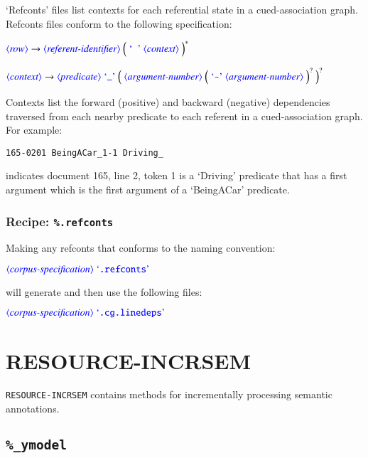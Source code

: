 \documentclass[12pt]{report}
\def\blue{\color{blue}}
\def\magenta{\color{magenta}}
\begin{document}
`Refconts' files list contexts for each referential state in a cued-association graph.
%
Refconts files conform to the following specification:

$\dtype{row} \rightarrow \dtype{referent-identifier} \ \Big( \ \dcode{\ } \ \dtype{context} \ \Big)^*$

$\dtype{context} \rightarrow \dtype{predicate} \ \dcode{\_} \ \Big( \ \dtype{argument-number} \ \Big( \ \dcode{-} \ \dtype{argument-number} \ \Big)^? \ \Big)^?$

Contexts list the forward (positive) and backward (negative) dependencies traversed from each nearby predicate to each referent in a cued-association graph.
%
For example:
%
{\magenta\begin{verbatim}
165-0201 BeingACar_1-1 Driving_
\end{verbatim}
}
%
indicates document 165, line 2, token 1 is a `Driving' predicate that has a first argument which is the first argument of a `BeingACar' predicate.

\subsection{Recipe: {\blue\tt \%.refconts}}

Making any refconts that conforms to the naming convention:

$\dtype{corpus-specification} \ \dcode{.refconts}$

will generate and then use the following files:

$\dtype{corpus-specification} \ \dcode{.cg.linedeps}$


\chapter{RESOURCE-INCRSEM}

{\tt RESOURCE-INCRSEM} contains methods for incrementally processing semantic annotations.

\section{{\blue\tt \%\_ymodel}}
\end{document}
